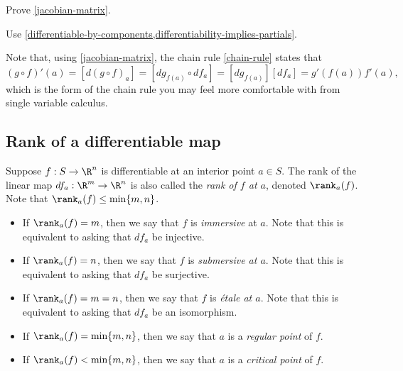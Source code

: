 \begin{exercise}
	Prove \cref{jacobian-matrix}. \begin{hint} Use \cref{differentiable-by-components,differentiability-implies-partials}. \end{hint}
\end{exercise}

Note that, using \cref{jacobian-matrix}, the chain rule \ref{chain-rule} states that 
\[ (g \circ f)'(a) = [d(g \circ f)_a] = [dg_{f(a)} \circ df_a] = [dg_{f(a)}] [df_a] = g'(f(a)) f'(a), \]
which is the form of the chain rule you may feel more comfortable with from single variable calculus.  

\subsection{Rank of a differentiable map}

\begin{definition} \label{immersive-submersive-critical}
	Suppose $f : S \to \R^n$ is differentiable at an interior point $a \in S$. The rank of the linear map $df_a : \R^m \to \R^n$ is also called the \emph{rank of $f$ at $a$}, denoted $\rank_a(f)$. Note that $\rank_a(f) \leq \min\{m,n\}$.
	\begin{itemize}
		\item If $\rank_a(f) = m$, then we say that $f$ is \emph{immersive} at $a$. Note that this is equivalent to asking that $df_a$ be injective. 
		\item If $\rank_a(f) = n$, then we say that $f$ is \emph{submersive at $a$}. Note that this is equivalent to asking that $df_a$ be surjective. 
		\item If $\rank_a(f) = m = n$, then we say that $f$ is \emph{\'etale at $a$}. Note that this is equivalent to asking that $df_a$ be an isomorphism. 
		\item If $\rank_a(f) = \min\{m,n\}$, then we say that $a$ is a \emph{regular point} of $f$. 
		\item If $\rank_a(f) < \min\{m,n\}$, then we say that $a$ is a \emph{critical point} of $f$.
	\end{itemize}
\end{definition}

